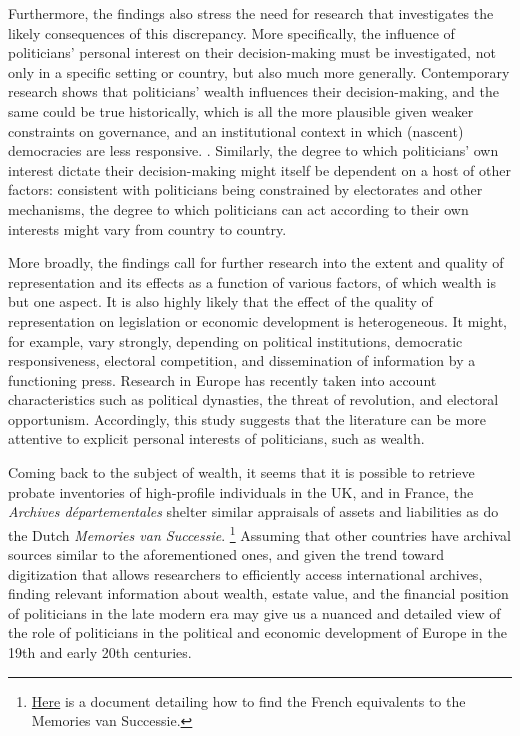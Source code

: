 Furthermore, the findings also stress the need for research that investigates the likely consequences of this discrepancy. More specifically, the influence of politicians' personal interest on their decision-making must be investigated, not only in a specific setting or country, but also much more generally. Contemporary research shows that politicians' wealth influences their decision-making, and the same could be true historically, which is all the more plausible given weaker constraints on governance, and an institutional context in which (nascent) democracies are less responsive. \autocite{tahoun2019personal}. Similarly, the  degree to which politicians' own interest dictate their decision-making might itself be dependent on a host of other factors: consistent with politicians being constrained by electorates and other mechanisms, the degree to which politicians can act according to their own interests might vary from country to country. \autocite{djankov2010disclosure}

More broadly, the findings call for further research into the extent and quality of representation and its effects as a function of various factors, of which wealth is but one aspect. It is also highly likely that the effect of the quality of representation on legislation or economic development is heterogeneous. It might, for example, vary strongly, depending on political institutions, democratic responsiveness, electoral competition, and dissemination of information by a functioning press. Research in Europe has recently taken into account characteristics such as political dynasties, the threat of revolution, and electoral opportunism. \autocite{aidt2014workers, oosterlinck2020positive, aidt2019motivates} Accordingly, this study suggests that the literature can be more attentive to explicit personal interests of politicians, such as wealth. 

Coming back to the subject of wealth, it seems that it is possible to retrieve probate inventories of high-profile individuals in the UK, and in France, the \textit{Archives départementales} shelter similar appraisals of assets and liabilities as do the Dutch \textit{Memories van Successie}. \autocite{bottomley2019returns} \footnote{\href{https://archives.cd08.fr/arkotheque/client/ad_ardennes/_depot_arko/articles/1834/tables-des-successions-et-absences-_doc.pdf}{Here} is a document detailing how to find the French equivalents to the Memories van Successie.} Assuming that other countries have archival sources similar to the aforementioned ones, and given the trend toward digitization that allows researchers to efficiently access international archives, finding relevant information about wealth, estate value, and the financial position of politicians in the late modern era may give us a nuanced and detailed view of the role of politicians in the political and economic development of Europe in the 19th and early 20th centuries. 

%
%
\clearpage
\printbibliography

